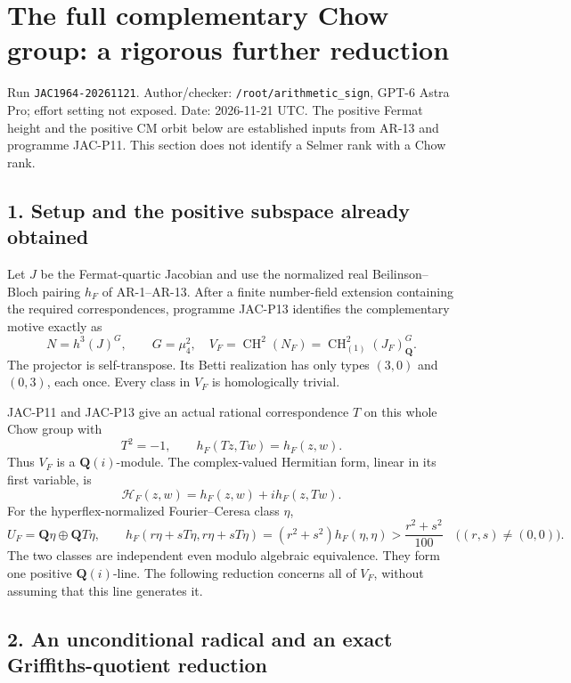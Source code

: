 \section{The full complementary Chow group: a rigorous further
reduction}\label{the-full-complementary-chow-group-a-rigorous-further-reduction}

Run \texttt{JAC1964-20261121}. Author/checker:
\texttt{/root/arithmetic\_sign}, GPT-6 Astra Pro; effort setting not
exposed. Date: 2026-11-21 UTC. The positive Fermat height and the
positive CM orbit below are established inputs from AR-13 and programme
JAC-P11. This section does not identify a Selmer rank with a Chow rank.

\subsection{1. Setup and the positive subspace already
obtained}\label{setup-and-the-positive-subspace-already-obtained}

Let \(J\) be the Fermat-quartic Jacobian and use the normalized real
Beilinson--Bloch pairing \(h_F\) of AR-1--AR-13. After a finite
number-field extension containing the required correspondences,
programme JAC-P13 identifies the complementary motive exactly as \[
N=h^3(J)^G,\qquad G=\mu_4^2,
\quad V_F=\operatorname{CH}^2(N_F)
       =\operatorname{CH}^2_{(1)}(J_F)_{\mathbf Q}^{G}.
\tag{AR15.1}
\] The projector is self-transpose. Its Betti realization has only types
\((3,0)\) and \((0,3)\), each once. Every class in \(V_F\) is
homologically trivial.

JAC-P11 and JAC-P13 give an actual rational correspondence \(T\) on this
whole Chow group with \[
T^2=-1,
\qquad h_F(Tz,Tw)=h_F(z,w).
\] Thus \(V_F\) is a \(\mathbf Q(i)\)-module. The complex-valued
Hermitian form, linear in its first variable, is \[
\mathscr H_F(z,w)=h_F(z,w)+i h_F(z,Tw).
\] For the hyperflex-normalized Fourier--Ceresa class \(\eta\), \[
U_F=\mathbf Q\eta\oplus\mathbf Q T\eta,
\qquad h_F(r\eta+sT\eta,r\eta+sT\eta)
  =(r^2+s^2)h_F(\eta,\eta)>
  \frac{r^2+s^2}{100}\quad\bigl((r,s)\ne(0,0)\bigr).
\tag{AR15.2}
\] The two classes are independent even modulo algebraic equivalence.
They form one positive \(\mathbf Q(i)\)-line. The following reduction
concerns all of \(V_F\), without assuming that this line generates it.

\subsection{2. An unconditional radical and an exact Griffiths-quotient
reduction}\label{an-unconditional-radical-and-an-exact-griffiths-quotient-reduction}

